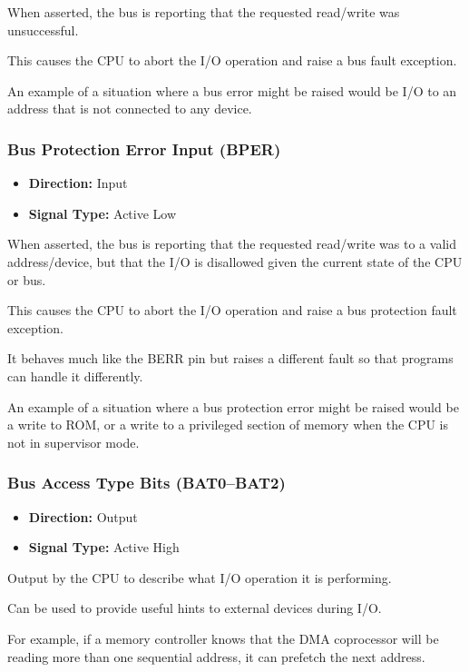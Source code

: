 When asserted, the bus is reporting that the requested read/write was unsuccessful.

This causes the CPU to abort the I/O operation and raise a bus fault exception.

An example of a situation where a bus error might be raised would be I/O to an address that is not connected to any
device.

\subsubsection{Bus Protection Error Input (BPER)}

\begin{itemize}
	\item \textbf{Direction:} Input
	\item \textbf{Signal Type:} Active Low
\end{itemize}

When asserted, the bus is reporting that the requested read/write was to a valid address/device, but that the I/O is
disallowed given the current state of the CPU or bus.

This causes the CPU to abort the I/O operation and raise a bus protection fault exception.

It behaves much like the BERR pin but raises a different fault so that programs can handle it differently.

An example of a situation where a bus protection error might be raised would be a write to ROM, or a write to a
privileged section of memory when the CPU is not in supervisor mode.

\subsubsection{Bus Access Type Bits (BAT0--BAT2)}

\begin{itemize}
	\item \textbf{Direction:} Output
	\item \textbf{Signal Type:} Active High
\end{itemize}

Output by the CPU to describe what I/O operation it is performing.

Can be used to provide useful hints to external devices during I/O.

For example, if a memory controller knows that the DMA coprocessor will be reading more than one sequential address, it
can prefetch the next address.

